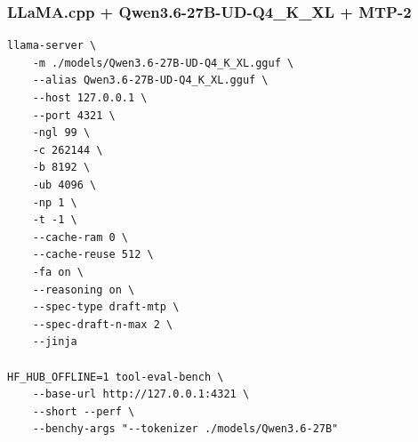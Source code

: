 \documentclass{article}
\begin{document}
\subsubsection{LLaMA.cpp + Qwen3.6-27B-UD-Q4\_K\_XL + MTP-2}
\begin{lstlisting}
llama-server \
    -m ./models/Qwen3.6-27B-UD-Q4_K_XL.gguf \
    --alias Qwen3.6-27B-UD-Q4_K_XL.gguf \
    --host 127.0.0.1 \
    --port 4321 \
    -ngl 99 \
    -c 262144 \
    -b 8192 \
    -ub 4096 \
    -np 1 \
    -t -1 \
    --cache-ram 0 \
    --cache-reuse 512 \
    -fa on \
    --reasoning on \
    --spec-type draft-mtp \
    --spec-draft-n-max 2 \
    --jinja

HF_HUB_OFFLINE=1 tool-eval-bench \
    --base-url http://127.0.0.1:4321 \
    --short --perf \
    --benchy-args "--tokenizer ./models/Qwen3.6-27B"
\end{lstlisting}
\end{document}
